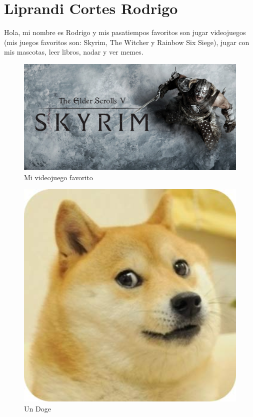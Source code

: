 \chapter{Liprandi Cortes Rodrigo}

Hola, mi nombre es Rodrigo y mis pasatiempos favoritos son jugar videojuegos (mis juegos favoritos son: Skyrim, The Witcher y Rainbow Six Siege), jugar con mis mascotas, leer libros, nadar y ver memes.

\begin{figure}[h] %
  \begin{center}
    \includegraphics[width=450pt]{317275605/syrim.jpg}
    \caption{Mi videojuego favorito} 
  \end{center}
\end{figure}

\begin{figure}[h] %
  \begin{center}
    \includegraphics[width=450pt]{317275605/doge.jpg}
    \caption{Un Doge}
  \end{center}
\end{figure}
